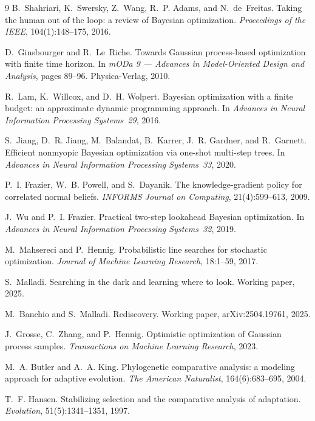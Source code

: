 \documentclass[11pt]{article}
\theoremstyle{itheads}
\begin{document}
\begin{thebibliography}{9}
B.~Shahriari, K.~Swersky, Z.~Wang, R.~P. Adams, and N.~de~Freitas.
Taking the human out of the loop: a review of Bayesian optimization.
\emph{Proceedings of the IEEE}, 104(1):148--175, 2016.

D.~Ginsbourger and R.~Le~Riche.
Towards Gaussian process-based optimization with finite time horizon.
In \emph{mODa 9 --- Advances in Model-Oriented Design and Analysis},
pages 89--96. Physica-Verlag, 2010.

R.~Lam, K.~Willcox, and D.~H. Wolpert.
Bayesian optimization with a finite budget: an approximate dynamic
programming approach.
In \emph{Advances in Neural Information Processing Systems~29}, 2016.

S.~Jiang, D.~R. Jiang, M.~Balandat, B.~Karrer, J.~R. Gardner, and
R.~Garnett.
Efficient nonmyopic Bayesian optimization via one-shot multi-step
trees.
In \emph{Advances in Neural Information Processing Systems~33}, 2020.

P.~I. Frazier, W.~B. Powell, and S.~Dayanik.
The knowledge-gradient policy for correlated normal beliefs.
\emph{INFORMS Journal on Computing}, 21(4):599--613, 2009.

J.~Wu and P.~I. Frazier.
Practical two-step lookahead Bayesian optimization.
In \emph{Advances in Neural Information Processing Systems~32}, 2019.

M.~Mahsereci and P.~Hennig.
Probabilistic line searches for stochastic optimization.
\emph{Journal of Machine Learning Research}, 18:1--59, 2017.

S.~Malladi.
Searching in the dark and learning where to look.
Working paper, 2025.

M.~Banchio and S.~Malladi.
Rediscovery.
Working paper, arXiv:2504.19761, 2025.

J.~Grosse, C.~Zhang, and P.~Hennig.
Optimistic optimization of Gaussian process samples.
\emph{Transactions on Machine Learning Research}, 2023.

M.~A. Butler and A.~A. King.
Phylogenetic comparative analysis: a modeling approach for adaptive
evolution.
\emph{The American Naturalist}, 164(6):683--695, 2004.

T.~F. Hansen.
Stabilizing selection and the comparative analysis of adaptation.
\emph{Evolution}, 51(5):1341--1351, 1997.


\end{thebibliography}
\end{document}
